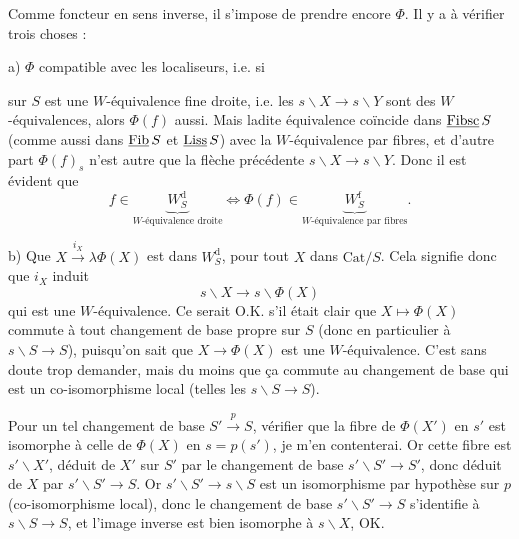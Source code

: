 Comme foncteur en sens inverse, il s'impose de prendre encore $\Phi$. Il y a à vérifier trois choses :

a) $\Phi$ compatible avec les localiseurs, i.e. si
sur $S$ est une $W$-équivalence fine droite, i.e. les $s\backslash X \longrightarrow s\backslash Y$ sont des $W$-équivalences, alors $\Phi(f)$ aussi. Mais ladite équivalence coïncide
dans $\underline{\mathrm{Fibsc}}\,S$ (comme aussi dans $\underline{\mathrm{Fib}}\,S$ et $\underline{\mathrm{Liss}}\,S$) avec la $W$-équivalence par fibres, et d'autre part $\Phi(f)_s$ n'est autre que la flèche précédente $s\backslash X \longrightarrow s\backslash Y$. Donc il est évident que
\[f \in \underbrace{W_S^{\mathrm{d}}}_{W\text{-équivalence droite}} \iff \Phi(f) \in \underbrace{W_S^{\mathrm{f}}}_{W\text{-équivalence par fibres}} .\]

b) Que $X \xrightarrow{i_X} \lambda\Phi(X)$ est dans $W_S^{\mathrm{d}}$, pour tout $X$ dans $\mathrm{Cat}/S$. Cela signifie donc que $i_X$ induit
\[s\backslash X \longrightarrow s\backslash\Phi(X)\]
qui est une $W$-équivalence. Ce serait O.K. s'il était clair que $X \longmapsto \Phi(X)$ commute à tout changement de base propre sur $S$ (donc en particulier à $s\backslash S \longrightarrow S$), puisqu'on sait que $X \longrightarrow \Phi(X)$ est une $W$-équivalence. C'est sans doute trop demander, mais du moins que ça commute au changement de base qui est un co-isomorphisme local (telles les $s\backslash S \longrightarrow S$).

Pour un tel changement de base $S' \xrightarrow{p} S$, vérifier que la fibre de $\Phi(X')$ en $s'$ est isomorphe à celle de $\Phi(X)$ en $s = p(s')$, je m'en contenterai. Or cette fibre est $s'\backslash X'$, déduit de $X'$ sur $S'$ par le changement de base $s'\backslash S' \longrightarrow S'$, donc déduit de $X$ par $s'\backslash S' \longrightarrow S$. Or $s'\backslash S' \longrightarrow s\backslash S$ est un isomorphisme par hypothèse
sur $p$ (co-isomorphisme local), donc le changement de base $s'\backslash S' \longrightarrow S$ s'identifie à $s\backslash S \longrightarrow S$, et l'image inverse est bien isomorphe à $s\backslash X$, OK.

